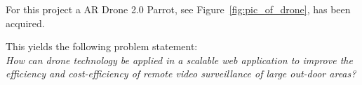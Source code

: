 For this project a AR Drone 2.0 Parrot, see Figure~\ref{fig:pic_of_drone}, has been acquired.

This yields the following problem statement: \\

\textit{How can drone technology be applied in a scalable web application to improve the efficiency and cost-efficiency of remote video surveillance of large out-door areas?}